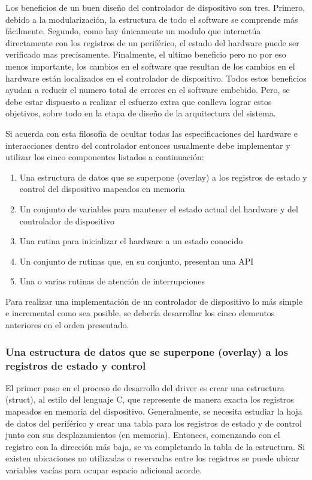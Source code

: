 \documentclass[output=paper, 
colorlinks,
citecolor=brown,
newtxmath
]{langscibook}
\begin{document}
Los beneficios de un buen diseño del controlador de dispositivo son tres.
Primero, debido a la modularización, la estructura de todo el software
se comprende más fácilmente. Segundo, como hay únicamente un modulo 
que interactúa directamente con los registros de un periférico, el estado
del hardware puede ser verificado mas precisamente. Finalmente, el ultimo 
beneficio pero no por eso menos importante, los cambios en el software que
resultan de los cambios en el hardware están localizados en el controlador
de dispositivo. Todos estos beneficios ayudan a reducir el numero total
de errores en el software embebido.
Pero, se debe estar dispuesto a
realizar el esfuerzo extra que conlleva lograr estos objetivos,
sobre todo en la etapa de diseño de la arquitectura del sistema.

Si acuerda con esta filosofía de ocultar todas las especificaciones del hardware
e interacciones dentro del controlador entonces usualmente debe 
implementar y utilizar los cinco componentes listados a continuación:

\begin{enumerate}
\item Una estructura de datos que se superpone (overlay) a los registros de estado
y control del dispositivo mapeados en memoria
\item Un conjunto de variables para mantener el estado actual del hardware
y del controlador de dispositivo
\item Una rutina para inicializar el hardware a un estado conocido
\item Un conjunto de rutinas que, en su conjunto, presentan una API 
\item Una o varias rutinas de atención de interrupciones

\end{enumerate}

Para realizar una implementación de un controlador de dispositivo lo más simple 
e incremental como sea posible, se debería desarrollar los cinco elementos anteriores
en el orden presentado.

\subsubsection*{Una estructura de datos que se superpone (overlay) a los registros de estado
y control}

El primer paso en el proceso de desarrollo del driver es crear una estructura
(struct), al estilo del lenguaje C, que represente de manera exacta los registros
mapeados en memoria del dispositivo. Generalmente, se necesita estudiar
la hoja de datos del periférico y crear una tabla para los registros
de estado y de control junto con sus desplazamientos (en memoria).
Entonces, comenzando con el registro con la dirección más baja, se 
va completando la tabla de la estructura. Si existen ubicaciones no 
utilizadas o reservadas entre los registros se puede ubicar variables
vacías para ocupar espacio adicional acorde.
\end{document}
